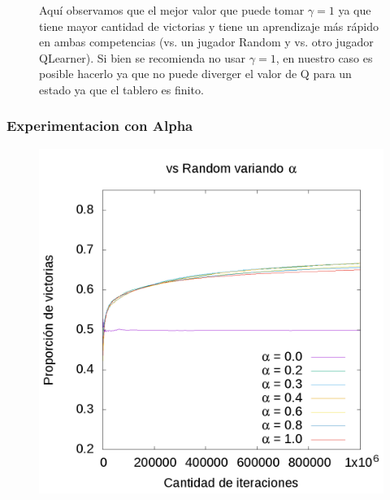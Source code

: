 \documentclass[10pt, a4paper]{article}
\begin{document}
\begin{figure}[H]
\begin{minipage}[c]{1\textwidth}
	\caption{Aquí observamos que el mejor valor que puede tomar $\gamma = 1$ ya que tiene mayor cantidad de victorias y tiene un aprendizaje más rápido en ambas competencias (vs. un jugador Random y vs. otro jugador QLearner). Si bien se recomienda no usar $\gamma = 1$, en nuestro caso es posible hacerlo ya que no puede diverger el valor de Q para un estado ya que el tablero es finito. }
  \end{minipage}
\end{figure}
\subsubsection{Experimentacion con Alpha}
\begin{figure}[H]
  \begin{minipage}[c]{1\textwidth}
  \includegraphics[scale=0.25]{AlphaR.png}

\end{minipage}
\end{figure}
\end{document}
